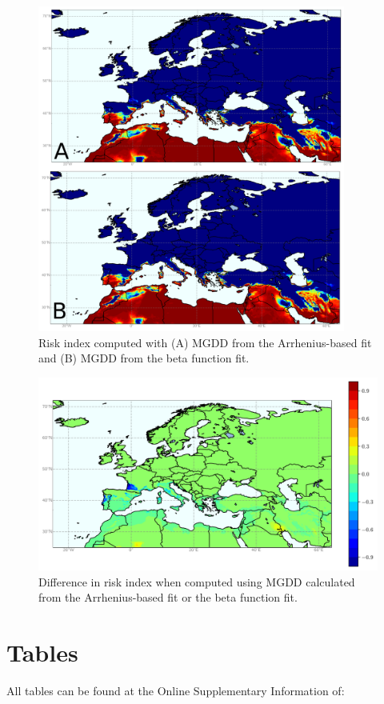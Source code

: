 \begin{figure}[H]
    \centering
    \includegraphics[width=0.9\textwidth]{Figures/Risk_risk_beta.png}
    \caption{Risk index computed with (A) MGDD from the Arrhenius-based fit and
        (B) MGDD from the beta function fit.}
    \label{fig:R2} %
\end{figure}

\begin{figure}[H]
    \centering

    \includegraphics[width=\textwidth]{Figures/Diff_risk_beta_minus_risk.png}
    \caption{Difference in risk index when computed using MGDD calculated from
        the Arrhenius-based fit or the beta function fit.}
    \label{fig:R3} %
\end{figure}

\section{Tables}

All tables can be found at the Online Supplementary Information of:

\begin{center}
\end{center}

%
